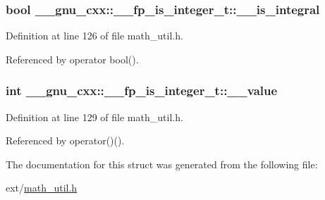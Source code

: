\subsubsection[{\texorpdfstring{\+\_\+\+\_\+is\+\_\+integral}{__is_integral}}]{\setlength{\rightskip}{0pt plus 5cm}bool \+\_\+\+\_\+gnu\+\_\+cxx\+::\+\_\+\+\_\+fp\+\_\+is\+\_\+integer\+\_\+t\+::\+\_\+\+\_\+is\+\_\+integral}\hypertarget{struct____gnu__cxx_1_1____fp__is__integer__t_a11cf72023d9f2eb1e3982d093de58493}{}\label{struct____gnu__cxx_1_1____fp__is__integer__t_a11cf72023d9f2eb1e3982d093de58493}


Definition at line 126 of file math\+\_\+util.\+h.



Referenced by operator bool().

\subsubsection[{\texorpdfstring{\+\_\+\+\_\+value}{__value}}]{\setlength{\rightskip}{0pt plus 5cm}int \+\_\+\+\_\+gnu\+\_\+cxx\+::\+\_\+\+\_\+fp\+\_\+is\+\_\+integer\+\_\+t\+::\+\_\+\+\_\+value}\hypertarget{struct____gnu__cxx_1_1____fp__is__integer__t_ad30e10c2e2dc2b23d42b4bbbf5592425}{}\label{struct____gnu__cxx_1_1____fp__is__integer__t_ad30e10c2e2dc2b23d42b4bbbf5592425}


Definition at line 129 of file math\+\_\+util.\+h.



Referenced by operator()().



The documentation for this struct was generated from the following file\+:\begin{DoxyCompactItemize}
\item 
ext/\hyperlink{math__util_8h}{math\+\_\+util.\+h}\end{DoxyCompactItemize}
